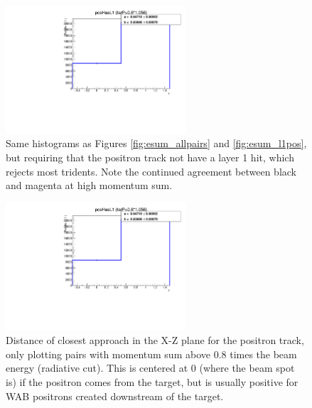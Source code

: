 \begin{figure}[ht]
\begin{center}
    \includegraphics[width=0.6\textwidth,page=26,angle=-90]{recon/figs/wabratioplots}
\end{center}
    \caption{Same histograms as Figures \ref{fig:esum_allpairs} and \ref{fig:esum_l1pos}, but requiring that the positron track not have a layer 1 hit, which rejects most tridents.
    Note the continued agreement between black and magenta at high momentum sum.
    }
    \label{fig:esum_nol1pos}
\end{figure}

\begin{figure}[ht]
\begin{center}
    \includegraphics[width=0.6\textwidth,page=6,angle=-90]{recon/figs/wabratioplots}
\end{center}
    \caption{Distance of closest approach in the X-Z plane for the positron track, only plotting pairs with momentum sum above 0.8 times the beam energy (radiative cut).
    This is centered at 0 (where the beam spot is) if the positron comes from the target, but is usually positive for WAB positrons created downstream of the target.
    }
    \label{fig:pos_d0}
\end{figure}

